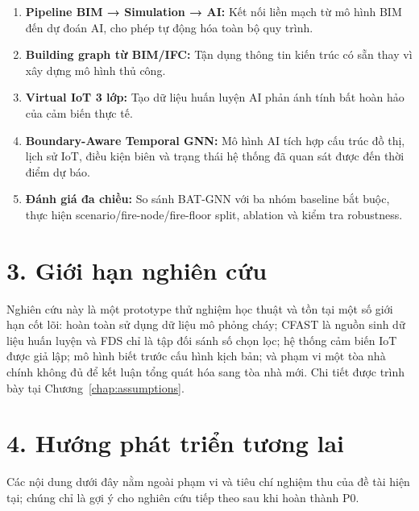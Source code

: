 \begin{enumerate}
  \item \textbf{Pipeline BIM → Simulation → AI:} Kết nối liền mạch từ mô hình BIM đến dự đoán AI, cho phép tự động hóa toàn bộ quy trình.
  \item \textbf{Building graph từ BIM/IFC:} Tận dụng thông tin kiến trúc có sẵn thay vì xây dựng mô hình thủ công.
  \item \textbf{Virtual IoT 3 lớp:} Tạo dữ liệu huấn luyện AI phản ánh tính bất hoàn hảo của cảm biến thực tế.
  \item \textbf{Boundary-Aware Temporal GNN:} Mô hình AI tích hợp cấu trúc đồ thị, lịch sử IoT, điều kiện biên và trạng thái hệ thống đã quan sát được đến thời điểm dự báo.
  \item \textbf{Đánh giá đa chiều:} So sánh BAT-GNN với ba nhóm baseline bắt buộc, thực hiện scenario/fire-node/fire-floor split, ablation và kiểm tra robustness.
\end{enumerate}

\section*{3. Giới hạn nghiên cứu}

Nghiên cứu này là một prototype thử nghiệm học thuật và tồn tại một số giới hạn cốt lõi: hoàn toàn sử dụng dữ liệu mô phỏng cháy; CFAST là nguồn sinh dữ liệu huấn luyện và FDS chỉ là tập đối sánh số chọn lọc; hệ thống cảm biến IoT được giả lập; mô hình biết trước cấu hình kịch bản; và phạm vi một tòa nhà chính không đủ để kết luận tổng quát hóa sang tòa nhà mới. Chi tiết được trình bày tại Chương~\ref{chap:assumptions}.

\section*{4. Hướng phát triển tương lai}

Các nội dung dưới đây nằm ngoài phạm vi và tiêu chí nghiệm thu của đề tài hiện tại; chúng chỉ là gợi ý cho nghiên cứu tiếp theo sau khi hoàn thành P0.

